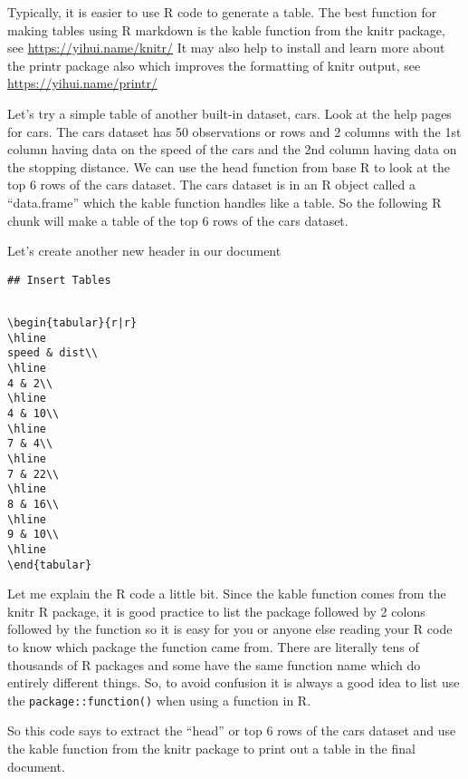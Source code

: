 \documentclass[
]{book}
\begin{document}
Typically, it is easier to use R code to generate a table. The best function for making tables using R markdown is the kable function from the knitr package, see \url{https://yihui.name/knitr/} It may also help to install and learn more about the printr package also which improves the formatting of knitr output, see \url{https://yihui.name/printr/}

Let's try a simple table of another built-in dataset, cars. Look at the help pages for cars. The cars dataset has 50 observations or rows and 2 columns with the 1st column having data on the speed of the cars and the 2nd column having data on the stopping distance. We can use the head function from base R to look at the top 6 rows of the cars dataset. The cars dataset is in an R object called a ``data.frame'' which the kable function handles like a table. So the following R chunk will make a table of the top 6 rows of the cars dataset.

Let's create another new header in our document

\texttt{\#\#\ Insert\ Tables}

\begin{verbatim}

\begin{tabular}{r|r}
\hline
speed & dist\\
\hline
4 & 2\\
\hline
4 & 10\\
\hline
7 & 4\\
\hline
7 & 22\\
\hline
8 & 16\\
\hline
9 & 10\\
\hline
\end{tabular}
\end{verbatim}

Let me explain the R code a little bit. Since the kable function comes from the knitr R package, it is good practice to list the package followed by 2 colons followed by the function so it is easy for you or anyone else reading your R code to know which package the function came from. There are literally tens of thousands of R packages and some have the same function name which do entirely different things. So, to avoid confusion it is always a good idea to list use the \texttt{package::function()} when using a function in R.

So this code says to extract the ``head'' or top 6 rows of the cars dataset and use the kable function from the knitr package to print out a table in the final document.
\end{document}
